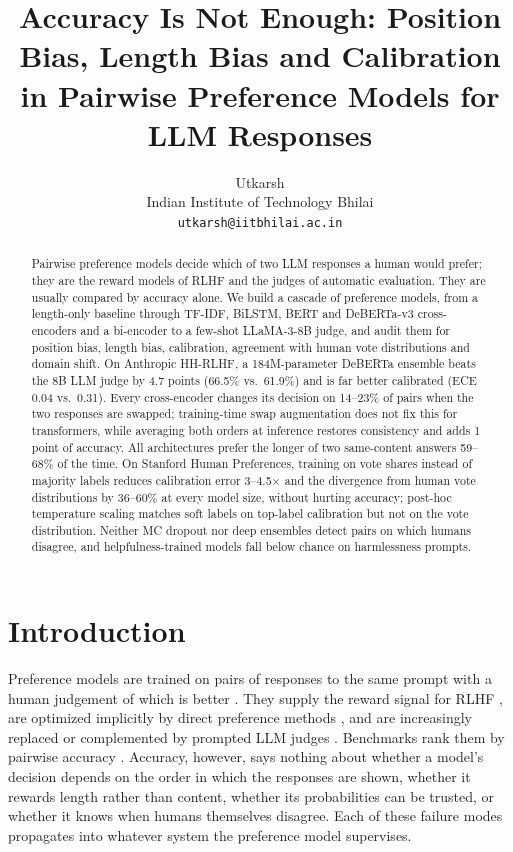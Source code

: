 \documentclass[11pt]{article}
\title{Accuracy Is Not Enough: Position Bias, Length Bias and Calibration\\
in Pairwise Preference Models for LLM Responses}
\author{Utkarsh \\
  Indian Institute of Technology Bhilai \\
  \texttt{utkarsh@iitbhilai.ac.in}}
\begin{document}
\maketitle

\begin{abstract}
Pairwise preference models decide which of two LLM responses a human would prefer; they are the reward models of RLHF and the judges of automatic evaluation. They are usually compared by accuracy alone. We build a cascade of preference models, from a length-only baseline through TF-IDF, BiLSTM, BERT and DeBERTa-v3 cross-encoders and a bi-encoder to a few-shot LLaMA-3-8B judge, and audit them for position bias, length bias, calibration, agreement with human vote distributions and domain shift. On Anthropic HH-RLHF, a 184M-parameter DeBERTa ensemble beats the 8B LLM judge by 4.7 points (66.5\% vs.\ 61.9\%) and is far better calibrated (ECE 0.04 vs.\ 0.31). Every cross-encoder changes its decision on 14--23\% of pairs when the two responses are swapped; training-time swap augmentation does not fix this for transformers, while averaging both orders at inference restores consistency and adds 1 point of accuracy. All architectures prefer the longer of two same-content answers 59--68\% of the time. On Stanford Human Preferences, training on vote shares instead of majority labels reduces calibration error 3--4.5$\times$ and the divergence from human vote distributions by 36--60\% at every model size, without hurting accuracy; post-hoc temperature scaling matches soft labels on top-label calibration but not on the vote distribution. Neither MC dropout nor deep ensembles detect pairs on which humans disagree, and helpfulness-trained models fall below chance on harmlessness prompts.
\end{abstract}

\section{Introduction}

Preference models are trained on pairs of responses to the same prompt with a human judgement of which is better \citep{christiano2017deep,stiennon2020learning}. They supply the reward signal for RLHF \citep{ouyang2022training,bai2022training}, are optimized implicitly by direct preference methods \citep{rafailov2023direct}, and are increasingly replaced or complemented by prompted LLM judges \citep{zheng2023judging}. Benchmarks rank them by pairwise accuracy \citep{lambert2024rewardbench}. Accuracy, however, says nothing about whether a model's decision depends on the order in which the responses are shown, whether it rewards length rather than content, whether its probabilities can be trusted, or whether it knows when humans themselves disagree. Each of these failure modes propagates into whatever system the preference model supervises.
\end{document}
